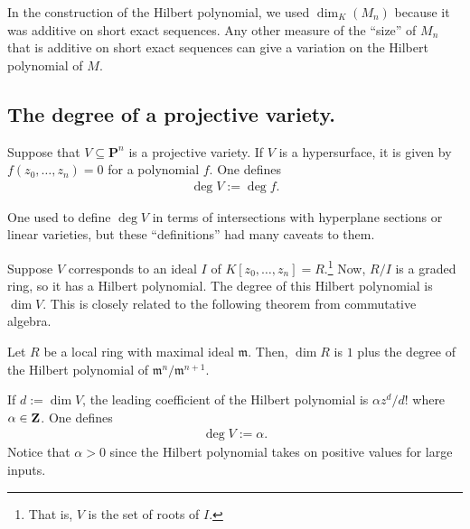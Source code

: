 \documentclass [11 pt, oneside] {article}
\begin{document}
\begin{remark}
In the construction of the Hilbert polynomial, we used $\dim_K(M_n)$ because it was additive on short exact sequences. Any other measure of the ``size'' of $M_n$ that is additive on short exact sequences can give a variation on the Hilbert polynomial of $M$.	
\end{remark}

\subsection{The degree of a projective variety.}
Suppose that $V\subseteq \mathbf{P}^n$ is a projective variety. If $V$ is a hypersurface, it is given by $f(z_0,\hdots,z_n)=0$ for a polynomial $f$. One defines
\begin{align*}
	\deg V := \deg f.
\end{align*}

One used to define $\deg V$ in terms of intersections with hyperplane sections or linear varieties, but these ``definitions'' had many caveats to them.

Suppose $V$ corresponds to an ideal $I$ of $K[z_0,\hdots, z_n]=R$.\footnote{That is, $V$ is the set of roots of $I$.} Now, $R/I$ is a graded ring, so it has a Hilbert polynomial. The degree of this Hilbert polynomial is $\dim V$. This is closely related to the following theorem from commutative algebra.

\begin{theorem}[ ]\label{}\index{}\text{}
Let $R$ be a local ring with maximal ideal $\mathfrak{m}$. Then, $\dim R$ is $1$ plus the degree of the Hilbert polynomial of $\mathfrak{m}^n / \mathfrak{m}^{n+1}$.
\end{theorem}

If $d:=\dim V$, the leading coefficient of the Hilbert polynomial is $\alpha z^d/d!$ where $\alpha\in \mathbf Z$. One defines
\begin{align*}
	\deg V := \alpha.
\end{align*}
Notice that $\alpha>0$ since the Hilbert polynomial takes on positive values for large inputs.
\end{document}
